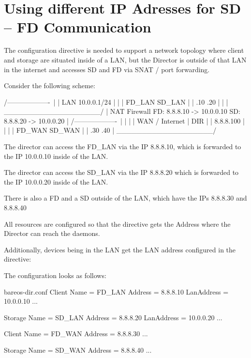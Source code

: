    \section{Using different IP Adresses for SD -- FD Communication}
   \label{LanAddress}

The  configuration directive is needed to support a network
topology where client and storage are situated inside of a LAN,  but the Director is
outside of that LAN in the internet and accesses SD and FD via SNAT / port forwarding.

Consider the following scheme:

\begin{commands}{}
   /-------------------\
   |                   |    LAN 10.0.0.1/24
   |                   |
   |  FD_LAN   SD_LAN  |
   |  .10         .20  |
   |                   |
   \___________________/
             |
         NAT Firewall
         FD: 8.8.8.10 -> 10.0.0.10
         SD: 8.8.8.20 -> 10.0.0.20
             |
   /-------------------\
   |                   |
   |                   |     WAN / Internet
   |        DIR        |
   |     8.8.8.100     |
   |                   |
   | FD_WAN   SD_WAN   |
   | .30         .40   |
   \___________________/
   \end{commands}

The director can access the FD\_LAN via the IP 8.8.8.10, which is
forwarded to the IP 10.0.0.10 inside of the LAN.

The director can access the SD\_LAN via the IP 8.8.8.20 which is
forwarded to the IP 10.0.0.20 inside of the LAN.

There is also a FD and a SD outside of the LAN, which have the IPs
8.8.8.30 and 8.8.8.40

All resources are configured so that the  directive gets the
Address where the Director can reach the daemons.

Additionally, devices being in the LAN get the LAN address configured in
the  directive:

The configuration looks as follows:

\begin{bconfig}{bareos-dir.conf}
Client {
   Name = FD_LAN
   Address = 8.8.8.10
   LanAddress = 10.0.0.10
   ...
}

Storage {
   Name = SD_LAN
   Address = 8.8.8.20
   LanAddress = 10.0.0.20
   ...
}

Client {
   Name = FD_WAN
   Address = 8.8.8.30
   ...
}

Storage {
   Name = SD_WAN
   Address = 8.8.8.40
   ...
}
\end{bconfig}

